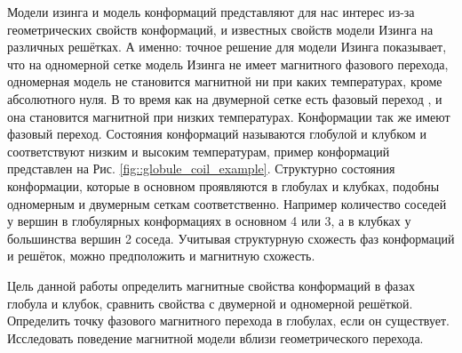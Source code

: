 Модели изинга и модель конформаций представляют для нас интерес из-за геометрических свойств конформаций, и известных свойств модели Изинга на различных решётках. А именно: точное решение для модели Изинга \cite{ising_solutions} показывает, что на одномерной сетке модель Изинга не имеет магнитного фазового перехода, одномерная модель не становится магнитной ни при каких температурах, кроме абсолютного нуля. В то время как на двумерной сетке есть фазовый переход \cite{SAW_polymer_critical}, и она становится магнитной при низких температурах. Конформации так же имеют фазовый переход. Состояния конформаций называются глобулой и клубком и соответствуют низким и высоким температурам, пример конформаций представлен на Рис. \ref{fig::globule_coil_example}. Структурно состояния конформации, которые в основном проявляются в глобулах и клубках, подобны одномерным и двумерным сеткам соответственно. Например количество соседей у вершин в глобулярных конформациях в основном 4 или 3, а в клубках у большинства вершин 2 соседа. Учитывая структурную схожесть фаз конформаций и решёток, можно предположить и магнитную схожесть.

Цель данной работы определить магнитные свойства конформаций в фазах глобула и клубок, сравнить свойства с двумерной и одномерной решёткой. Определить точку фазового магнитного перехода в глобулах, если он существует. Исследовать поведение магнитной модели вблизи геометрического перехода.